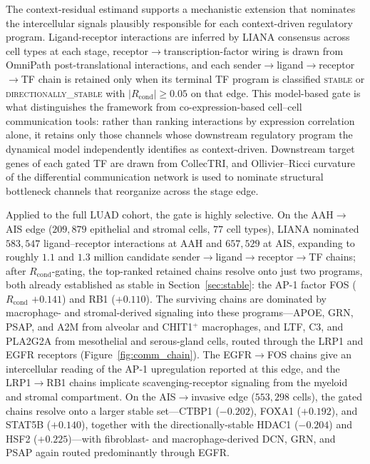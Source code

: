 The context-residual estimand supports a mechanistic extension that nominates the intercellular signals plausibly responsible for each context-driven regulatory program. Ligand-receptor interactions are inferred by LIANA consensus across cell types at each stage, receptor$\rightarrow$transcription-factor wiring is drawn from OmniPath post-translational interactions, and each sender$\rightarrow$ligand$\rightarrow$receptor$\rightarrow$TF chain is retained only when its terminal TF program is classified \textsc{stable} or \textsc{directionally\_stable} with $|R_{\text{cond}}| \geq 0.05$ on that edge. This model-based gate is what distinguishes the framework from co-expression-based cell--cell communication tools: rather than ranking interactions by expression correlation alone, it retains only those channels whose downstream regulatory program the dynamical model independently identifies as context-driven. Downstream target genes of each gated TF are drawn from CollecTRI, and Ollivier--Ricci curvature of the differential communication network is used to nominate structural bottleneck channels that reorganize across the stage edge.

Applied to the full LUAD cohort, the gate is highly selective. On the AAH$\rightarrow$AIS edge ($209{,}879$ epithelial and stromal cells, $77$ cell types), LIANA nominated $583{,}547$ ligand--receptor interactions at AAH and $657{,}529$ at AIS, expanding to roughly $1.1$ and $1.3$ million candidate sender$\rightarrow$ligand$\rightarrow$receptor$\rightarrow$TF chains; after $R_{\text{cond}}$-gating, the top-ranked retained chains resolve onto just two programs, both already established as stable in Section~\ref{sec:stable}: the AP-1 factor FOS ($R_{\text{cond}}$ $+0.141$) and RB1 ($+0.110$). The surviving chains are dominated by macrophage- and stromal-derived signaling into these programs---APOE, GRN, PSAP, and A2M from alveolar and CHIT1$^{+}$ macrophages, and LTF, C3, and PLA2G2A from mesothelial and serous-gland cells, routed through the LRP1 and EGFR receptors (Figure~\ref{fig:comm_chain}). The EGFR$\rightarrow$FOS chains give an intercellular reading of the AP-1 upregulation reported at this edge, and the LRP1$\rightarrow$RB1 chains implicate scavenging-receptor signaling from the myeloid and stromal compartment. On the AIS$\rightarrow$invasive edge ($553{,}298$ cells), the gated chains resolve onto a larger stable set---CTBP1 ($-0.202$), FOXA1 ($+0.192$), and STAT5B ($+0.140$), together with the directionally-stable HDAC1 ($-0.204$) and HSF2 ($+0.225$)---with fibroblast- and macrophage-derived DCN, GRN, and PSAP again routed predominantly through EGFR.

